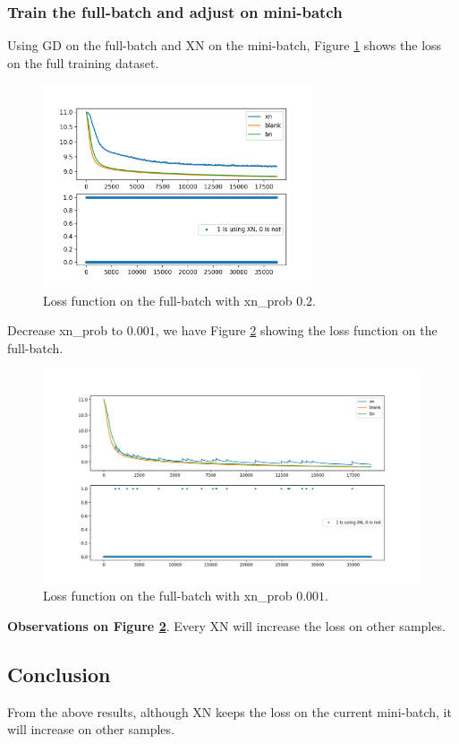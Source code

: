 \subsubsection{Train the full-batch and adjust on mini-batch}
Using GD on the full-batch and XN on the mini-batch, Figure \ref{fig:XN_MNIST_full} shows the loss on the full training dataset.
\begin{figure}[H]
	\center
	\includegraphics*[width=8cm]{./figures/XN15.png}
	\caption{Loss function on the full-batch with xn\_prob $0.2$.}
	\label{fig:XN_MNIST_full}
\end{figure}
Decrease xn\_prob to $0.001$, we have Figure \ref{fig:XN_MNIST_full_0001} showing the loss function on the full-batch.
\begin{figure}[H]
	\center
	\includegraphics*[width=\textwidth]{./figures/XN17.png}
	\caption{Loss function on the full-batch with xn\_prob $0.001$.}
	\label{fig:XN_MNIST_full_0001}
\end{figure}

\textbf{Observations on Figure \ref{fig:XN_MNIST_full_0001}}. Every XN will increase the loss on other samples.

\subsection{Conclusion}
From the above results, although XN keeps the loss on the current mini-batch, it will increase on other samples.

